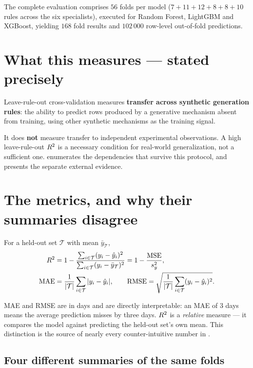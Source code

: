 The complete evaluation comprises $56$ folds per model
($7+11+12+8+8+10$ rules across the six specialists), executed for Random
Forest, LightGBM and XGBoost, yielding $168$ fold results and
$102\,000$ row-level out-of-fold predictions.

\section{What this measures --- stated precisely}

\begin{limitbox}[title=Scope of the claim]
Leave-rule-out cross-validation measures \textbf{transfer across synthetic
generation rules}: the ability to predict rows produced by a generative
mechanism absent from training, using other synthetic mechanisms as the
training signal.

It does \textbf{not} measure transfer to independent experimental
observations. A high leave-rule-out $R^2$ is a necessary condition for
real-world generalization, not a sufficient one. 
enumerates the dependencies that survive this protocol, and
 presents the separate external evidence.
\end{limitbox}

\section{The metrics, and why their summaries disagree}

For a held-out set $\mathcal{T}$ with mean $\bar{y}_{\mathcal{T}}$,
\begin{align}
R^2 &= 1 - \frac{\sum_{i \in \mathcal{T}} (y_i - \hat{y}_i)^2}
                  {\sum_{i \in \mathcal{T}} (y_i - \bar{y}_{\mathcal{T}})^2}
       = 1 - \frac{\text{MSE}}{s_y^2}, \\
\text{MAE} &= \frac{1}{|\mathcal{T}|}\sum_{i \in \mathcal{T}} |y_i - \hat{y}_i|,
\qquad
\text{RMSE} = \sqrt{\frac{1}{|\mathcal{T}|}\sum_{i \in \mathcal{T}} (y_i - \hat{y}_i)^2}.
\end{align}

MAE and RMSE are in days and are directly interpretable: an MAE of $3$ days
means the average prediction misses by three days. $R^2$ is a
\emph{relative} measure --- it compares the model against predicting the
held-out set's own mean. This distinction is the source of nearly every
counter-intuitive number in .

\subsection{Four different summaries of the same folds}

